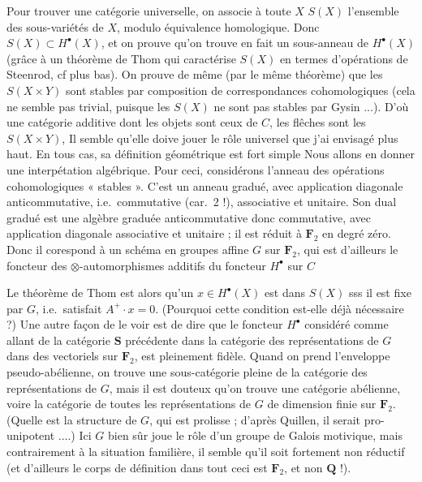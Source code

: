 \documentclass[11pt,a4paper]{article}
\begin{document}
Pour trouver une catégorie universelle, on associe à toute $X$ $S(X)$
l'ensemble des sous-variétés de $X$, modulo équivalence homologique. Donc
$S(X) \subset H^{\bullet}(X)$, et on prouve qu'on trouve en fait un sous-anneau
de $H^{\bullet}(X)$ (grâce à un théorème de Thom qui caractérise $S(X)$ en
termes d'opérations de Steenrod, cf plus bas). On prouve de même (par le même
théorème) que les $S(X \times Y)$ sont stables par composition de
correspondances cohomologiques (cela ne semble pas trivial, puisque les
$S(X)$ ne sont pas stables par Gysin ...). D'où une catégorie additive dont
les objets sont ceux de $C$, les flêches sont les  $S(X \times
Y)$, Il semble qu'elle doive jouer le rôle universel que j'ai envisagé plus
haut. En tous cas, sa définition géométrique est fort simple Nous allons en
donner une interpétation algébrique. Pour ceci, considérons l'anneau des
opérations cohomologiques « stables ». C'est un anneau gradué, avec
application diagonale anticommutative, i.e.\ commutative (car.\ 2 !),
associative et unitaire. Son dual gradué est une algèbre graduée
anticommutative donc commutative, avec application diagonale associative et
unitaire ; il est réduit à $\mathbf{F}_{2}$ en degré zéro. Donc il corespond à
un schéma en groupes affine $G$ sur $\mathbf{F}_{2}$, qui est d'ailleurs le
foncteur des $\otimes$-automorphismes additifs du foncteur $H^{\bullet}$ sur
$C$  \struck{\ill{}}


Le théorème de Thom est alors qu'un $x \in H^{\bullet}(X)$ est dans $S(X)$
sss il est fixe par $G$, i.e.\ satisfait $A^{+} \cdot x = 0$. (Pourquoi cette
condition est-elle déjà nécessaire ?) Une autre façon de le voir est de dire
que le foncteur $H^{\bullet}$ considéré comme allant de la catégorie
$\mathbf{S}$ précédente dans la catégorie des représentations de $G$ dans des
vectoriels sur $\mathbf{F}_{2}$, est pleinement fidèle. Quand on prend
l'enveloppe pseudo-abélienne, on trouve une sous-catégorie pleine de la
catégorie des représentations de $G$, mais il est douteux qu'on trouve une
catégorie abélienne, voire la catégorie de toutes les représentations de $G$ de
dimension finie sur $\mathbf{F}_{2}$. (Quelle est la structure de $G$, qui est
prolisse ; d'après Quillen, il serait pro-unipotent ....) Ici $G$ bien sûr
joue le rôle d'un groupe de Galois motivique, mais contrairement à la situation
familière, il semble qu'il soit fortement non réductif (et d'ailleurs le corps
de définition dans tout ceci est $\mathbf{F}_{2}$, et non $\mathbf{Q}$ !).
\end{document}

